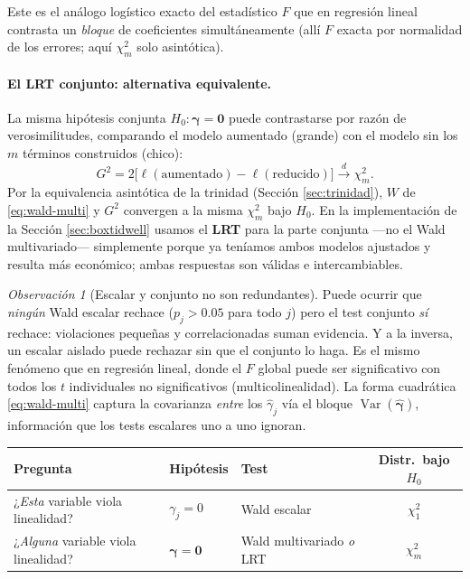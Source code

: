 \documentclass[11pt]{article}
\theoremstyle{plain}
\theoremstyle{definition}
\theoremstyle{remark}
\newtheorem{observacion}[teorema]{Observación}
\newcommand{\Var}{\operatorname{Var}}
\newcommand{\convd}{\xrightarrow{d}}
\begin{document}
Este es el análogo logístico exacto del estadístico $F$ que en regresión lineal
contrasta un \emph{bloque} de coeficientes simultáneamente (allí $F$ exacta por
normalidad de los errores; aquí $\chi^2_m$ solo asintótica).

\paragraph{El LRT conjunto: alternativa equivalente.}
La misma hipótesis conjunta $H_0:\bm\gamma=\bm0$ puede contrastarse por razón de
verosimilitudes, comparando el modelo aumentado (grande) con el modelo sin los
$m$ términos construidos (chico):
\[
  G^2 = 2\big[\ell(\text{aumentado}) - \ell(\text{reducido})\big]
  \convd\chi^2_m.
\]
Por la equivalencia asintótica de la trinidad (Sección \ref{sec:trinidad}),
$W$ de \eqref{eq:wald-multi} y $G^2$ convergen a la misma $\chi^2_m$ bajo $H_0$.
En la implementación de la Sección \ref{sec:boxtidwell} usamos el \textbf{LRT}
para la parte conjunta ---no el Wald multivariado--- simplemente porque ya
teníamos ambos modelos ajustados y resulta más económico; ambas respuestas son
válidas e intercambiables.

\begin{observacion}[Escalar y conjunto no son redundantes]
Puede ocurrir que \emph{ningún} Wald escalar rechace ($p_j>0.05$ para todo $j$)
pero el test conjunto \emph{sí} rechace: violaciones pequeñas y correlacionadas
suman evidencia. Y a la inversa, un escalar aislado puede rechazar sin que el
conjunto lo haga. Es el mismo fenómeno que en regresión lineal, donde el $F$
global puede ser significativo con todos los $t$ individuales no significativos
(multicolinealidad). La forma cuadrática \eqref{eq:wald-multi} captura la
covarianza \emph{entre} los $\hat\gamma_j$ vía el bloque
$\widehat{\Var}(\hat{\bm\gamma})$, información que los tests escalares uno a uno
ignoran.
\end{observacion}

\begin{center}
\begin{tabular}{lllc}
\toprule
Pregunta & Hipótesis & Test & Distr.\ bajo $H_0$ \\
\midrule
¿\emph{Esta} variable viola linealidad? & $\gamma_j=0$
  & Wald escalar & $\chi^2_1$ \\
¿\emph{Alguna} variable viola linealidad? & $\bm\gamma=\bm0$
  & Wald multivariado \emph{o} LRT & $\chi^2_m$ \\
\bottomrule
\end{tabular}
\end{center}
\end{document}
